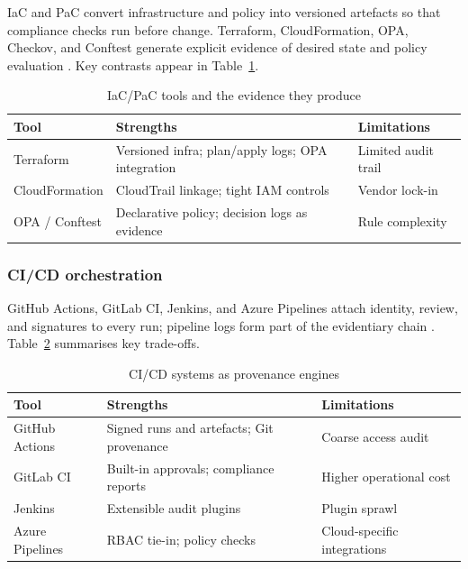 IaC and PaC convert infrastructure and policy into versioned artefacts so that
compliance checks run before change. Terraform, CloudFormation, OPA, Checkov,
and Conftest generate explicit evidence of desired state and policy evaluation
\cite{anisetti_devsecops-based_2022, elbaghazaoui_safeguarding_2025}. Key
contrasts appear in Table~\ref{tab:iac_pac_tools}.

\begin{table}[h]
  \centering
  \caption{IaC/PaC tools and the evidence they produce}
  \label{tab:iac_pac_tools}
  \begin{tabular}{@{}lll@{}}
    \toprule
    Tool & Strengths & Limitations \\
    \midrule
    Terraform & Versioned infra; plan/apply logs; OPA integration &
    Limited audit trail \\
    CloudFormation & CloudTrail linkage; tight IAM controls &
    Vendor lock-in \\
    OPA / Conftest & Declarative policy; decision logs as evidence &
    Rule complexity \\
    \bottomrule
  \end{tabular}
\end{table}

\subsubsection*{CI/CD orchestration}

GitHub Actions, GitLab CI, Jenkins, and Azure Pipelines attach identity,
review, and signatures to every run; pipeline logs form part of the evidentiary
chain \cite{souppaya_secure_2022, chen_design_2022}. Table~\ref{tab:cicd_systems}
summarises key trade-offs.

\begin{table}[h]
  \centering
  \caption{CI/CD systems as provenance engines}
  \label{tab:cicd_systems}
  \begin{tabular}{@{}lll@{}}
    \toprule
    Tool & Strengths & Limitations \\
    \midrule
    GitHub Actions & Signed runs and artefacts; Git provenance &
    Coarse access audit \\
    GitLab CI & Built-in approvals; compliance reports &
    Higher operational cost \\
    Jenkins & Extensible audit plugins &
    Plugin sprawl \\
    Azure Pipelines & RBAC tie-in; policy checks &
    Cloud-specific integrations \\
    \bottomrule
  \end{tabular}
\end{table}

